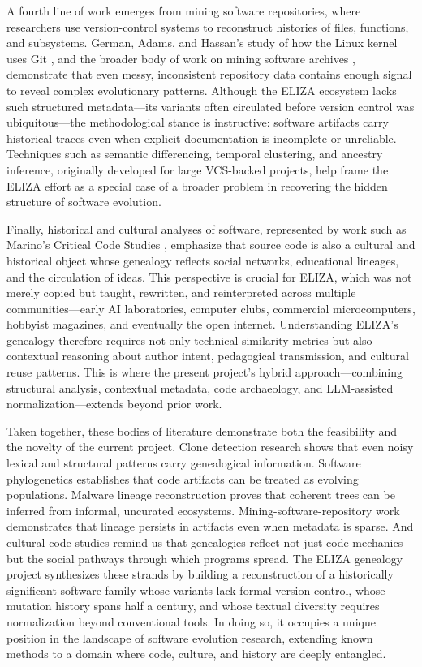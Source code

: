 \documentclass{article}
\begin{document}
A fourth line of work emerges from mining software repositories, where researchers use version-control systems to reconstruct histories of files, functions, and subsystems. German, Adams, and Hassan's study of how the Linux kernel uses Git \cite{german2016continuously}, and the broader body of work on mining software archives \cite{nagappan2009mining}, demonstrate that even messy, inconsistent repository data contains enough signal to reveal complex evolutionary patterns. Although the ELIZA ecosystem lacks such structured metadata—its variants often circulated before version control was ubiquitous—the methodological stance is instructive: software artifacts carry historical traces even when explicit documentation is incomplete or unreliable. Techniques such as semantic differencing, temporal clustering, and ancestry inference, originally developed for large VCS-backed projects, help frame the ELIZA effort as a special case of a broader problem in recovering the hidden structure of software evolution.

Finally, historical and cultural analyses of software, represented by work such as Marino’s Critical Code Studies \cite{marino2020critical}, emphasize that source code is also a cultural and historical object whose genealogy reflects social networks, educational lineages, and the circulation of ideas. This perspective is crucial for ELIZA, which was not merely copied but taught, rewritten, and reinterpreted across multiple communities—early AI laboratories, computer clubs, commercial microcomputers, hobbyist magazines, and eventually the open internet. Understanding ELIZA’s genealogy therefore requires not only technical similarity metrics but also contextual reasoning about author intent, pedagogical transmission, and cultural reuse patterns. This is where the present project’s hybrid approach—combining structural analysis, contextual metadata, code archaeology, and LLM-assisted normalization—extends beyond prior work.

Taken together, these bodies of literature demonstrate both the feasibility and the novelty of the current project. Clone detection research shows that even noisy lexical and structural patterns carry genealogical information. Software phylogenetics establishes that code artifacts can be treated as evolving populations. Malware lineage reconstruction proves that coherent trees can be inferred from informal, uncurated ecosystems. Mining-software-repository work demonstrates that lineage persists in artifacts even when metadata is sparse. And cultural code studies remind us that genealogies reflect not just code mechanics but the social pathways through which programs spread. The ELIZA genealogy project synthesizes these strands by building a reconstruction of a historically significant software family whose variants lack formal version control, whose mutation history spans half a century, and whose textual diversity requires normalization beyond conventional tools. In doing so, it occupies a unique position in the landscape of software evolution research, extending known methods to a domain where code, culture, and history are deeply entangled.
\end{document}
